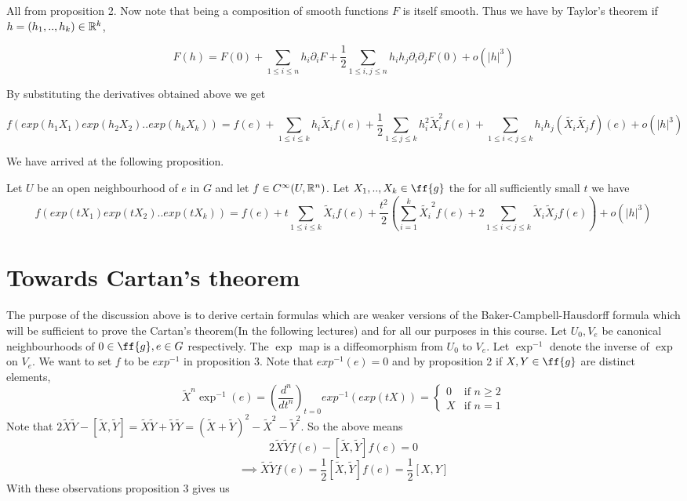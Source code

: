 \documentclass{article}
\begin{document}
All from proposition 2. Now note that being a composition of smooth functions $F$ is itself smooth. Thus we have by Taylor's theorem if $h = (h_1,..,h_k)\in \mathbb R^k$,

$$F(h) = F(0) + \sum_{1\leq i\leq n}h_i\partial_iF + \frac{1}{2}\sum_{1\leq i,j\leq n}h_ih_j\partial_i\partial_jF(0)+o(|h|^3)$$

By substituting the derivatives obtained above we get

$$f(exp(h_1X_1)exp(h_2X_2)..exp(h_kX_k)) = f(e) + \sum_{1\leq i\leq k}h_i \tilde{X}_if(e) + \frac{1}{2}\sum_{1\leq j\leq k}h_i^2\tilde{X}_i^2f(e)+ \sum_{1\leq i<j\leq k}h_ih_j(\tilde{X_i}\tilde{X_j}f)(e)+o(|h|^3)$$

We have arrived at the following proposition.

\begin{proposition}
    Let $U$ be an open neighbourhood of $e$ in $G$ and let $f\in C^{\infty}(U,\mathbb R^n)$. Let $X_1,..,X_k\in \ff{g}$ the for all sufficiently small $t$ we have 
    $$f(exp(tX_1)exp(tX_2)..exp(tX_k)) = f(e) + t\sum_{1\leq i\leq k}\tilde{X}_if(e) + \frac{t^2}{2}\left( \sum_{i=1}^k \tilde{X_i}^2f(e) + 2\sum_{1\leq i<j \leq k}\tilde{X}_i\tilde{X}_jf(e)\right) + o(|h|^3)$$
\end{proposition}

\section*{Towards Cartan's theorem}

The purpose of the discussion above is to derive certain formulas which are weaker versions of the Baker-Campbell-Hausdorff formula which will be sufficient to 
prove the Cartan's theorem(In the following lectures) and for all our purposes in this course. Let $U_0,V_e$ be canonical neighbourhoods of $0\in \ff{g},e\in G$ respectively. 
The $\exp$ map is a diffeomorphism from $U_0$ to $V_e$. Let $\exp^{-1}$ denote the inverse of $\exp$ on $V_e$. We want to set $f$ to be $exp^{-1}$ in proposition 3. Note that $exp^{-1}(e)=0$
and by proposition 2 if $X,Y\in \ff{g}$ are distinct elements,$$\tilde{X}^n\exp^{-1}(e) = \left(\frac{d^n}{dt^n}\right)_{t=0}exp^{-1}(exp(tX)) =  \begin{cases}
    0 & \text{if } n \geq 2\\
    X & \text{if } n = 1\end{cases}$$
Note that $2\tilde{X}\tilde{Y} - [\tilde{X},\tilde{Y}] = \tilde{X}\tilde{Y}+\tilde{Y}\tilde{Y} = (\tilde{X}+\tilde{Y})^2-\tilde{X}^2-\tilde{Y}^2$. So the above means
$$2\tilde{X}\tilde{Y}f(e) - [\tilde{X},\tilde{Y}]f(e) = 0$$
$$\implies \tilde{X}\tilde{Y}f(e) = \frac{1}{2}[\tilde{X},\tilde{Y}]f(e) = \frac{1}{2}[X,Y]$$
With these observations proposition 3 gives us
\end{document}
